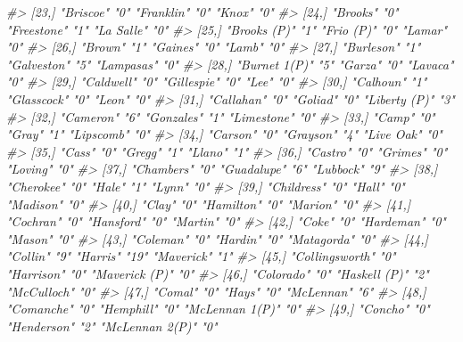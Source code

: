 \documentclass[
  12pt,
]{book}
\newenvironment{Shaded}{\begin{snugshade}}{\end{snugshade}}
\newcommand{\CommentTok}[1]{\textcolor[rgb]{0.37,0.37,0.37}{\textit{#1}}}
\begin{document}
\begin{Shaded}
\begin{Highlighting}[]
\CommentTok{\#\textgreater{} [23,] "Briscoe"       "0"  "Franklin"    "0"  "Knox"          "0" }
\CommentTok{\#\textgreater{} [24,] "Brooks"        "0"  "Freestone"   "1"  "La Salle"      "0" }
\CommentTok{\#\textgreater{} [25,] "Brooks (P)"    "1"  "Frio (P)"    "0"  "Lamar"         "0" }
\CommentTok{\#\textgreater{} [26,] "Brown"         "1"  "Gaines"      "0"  "Lamb"          "0" }
\CommentTok{\#\textgreater{} [27,] "Burleson"      "1"  "Galveston"   "5"  "Lampasas"      "0" }
\CommentTok{\#\textgreater{} [28,] "Burnet 1(P)"   "5"  "Garza"       "0"  "Lavaca"        "0" }
\CommentTok{\#\textgreater{} [29,] "Caldwell"      "0"  "Gillespie"   "0"  "Lee"           "0" }
\CommentTok{\#\textgreater{} [30,] "Calhoun"       "1"  "Glasscock"   "0"  "Leon"          "0" }
\CommentTok{\#\textgreater{} [31,] "Callahan"      "0"  "Goliad"      "0"  "Liberty (P)"   "3" }
\CommentTok{\#\textgreater{} [32,] "Cameron"       "6"  "Gonzales"    "1"  "Limestone"     "0" }
\CommentTok{\#\textgreater{} [33,] "Camp"          "0"  "Gray"        "1"  "Lipscomb"      "0" }
\CommentTok{\#\textgreater{} [34,] "Carson"        "0"  "Grayson"     "4"  "Live Oak"      "0" }
\CommentTok{\#\textgreater{} [35,] "Cass"          "0"  "Gregg"       "1"  "Llano"         "1" }
\CommentTok{\#\textgreater{} [36,] "Castro"        "0"  "Grimes"      "0"  "Loving"        "0" }
\CommentTok{\#\textgreater{} [37,] "Chambers"      "0"  "Guadalupe"   "6"  "Lubbock"       "9" }
\CommentTok{\#\textgreater{} [38,] "Cherokee"      "0"  "Hale"        "1"  "Lynn"          "0" }
\CommentTok{\#\textgreater{} [39,] "Childress"     "0"  "Hall"        "0"  "Madison"       "0" }
\CommentTok{\#\textgreater{} [40,] "Clay"          "0"  "Hamilton"    "0"  "Marion"        "0" }
\CommentTok{\#\textgreater{} [41,] "Cochran"       "0"  "Hansford"    "0"  "Martin"        "0" }
\CommentTok{\#\textgreater{} [42,] "Coke"          "0"  "Hardeman"    "0"  "Mason"         "0" }
\CommentTok{\#\textgreater{} [43,] "Coleman"       "0"  "Hardin"      "0"  "Matagorda"     "0" }
\CommentTok{\#\textgreater{} [44,] "Collin"        "9"  "Harris"      "19" "Maverick"      "1" }
\CommentTok{\#\textgreater{} [45,] "Collingsworth" "0"  "Harrison"    "0"  "Maverick (P)"  "0" }
\CommentTok{\#\textgreater{} [46,] "Colorado"      "0"  "Haskell (P)" "2"  "McCulloch"     "0" }
\CommentTok{\#\textgreater{} [47,] "Comal"         "0"  "Hays"        "0"  "McLennan"      "6" }
\CommentTok{\#\textgreater{} [48,] "Comanche"      "0"  "Hemphill"    "0"  "McLennan 1(P)" "0" }
\CommentTok{\#\textgreater{} [49,] "Concho"        "0"  "Henderson"   "2"  "McLennan 2(P)" "0" }

\end{Highlighting}
\end{Shaded}
\end{document}
